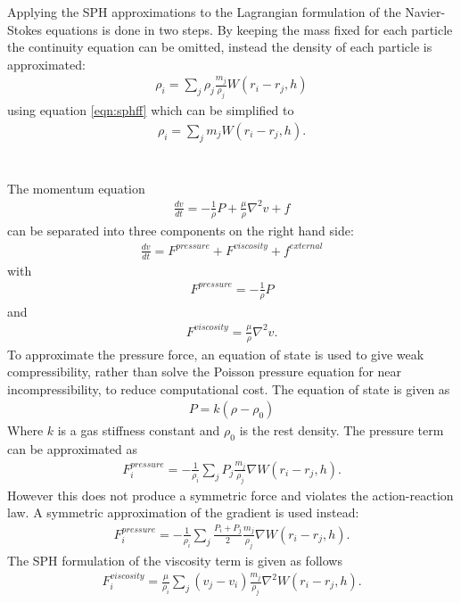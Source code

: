 Applying the SPH approximations to the Lagrangian formulation of the
Navier-Stokes equations is done in two steps. By keeping the mass fixed for each
particle the continuity equation can be omitted, instead the density of each particle is approximated:
\begin{align}
\rho_i = \sum_j \rho_j \frac{m_j}{\rho_j} W(r_i - r_j, h)
\end{align}
using equation \ref{eqn:sphff} which can be simplified to
\begin{align}
\rho_i = \sum_j m_j W(r_i - r_j, h).
\end{align}
\\
\\
The momentum equation
\begin{align}
\frac{dv}{dt} = -\frac{1}{\rho}P + \frac{\mu}{\rho} \nabla^2 v + f
\end{align}
can be separated into three components on the right hand side:
\begin{align} \frac{dv}{dt} = F^{pressure} + F^{viscosity} + f^{external} \end{align}
with
\begin{align}
F^{pressure} = -\frac{1}{\rho}P
\end{align}
and
\begin{align}
F^{viscosity} = \frac{\mu}{\rho} \nabla^2 v.
\end{align}
To approximate the pressure force, an equation of state is used to give weak
compressibility, rather than solve the Poisson pressure equation for near
incompressibility, to reduce computational cost.
The equation of state is given as 
\begin{align}
P = k(\rho - \rho_0)
\end{align}
Where $k$ is a gas stiffness constant and $\rho_0$ is the rest density.
The pressure term can be approximated as
\begin{align}
F^{pressure}_i = -\frac{1}{\rho_i} \sum_j P_j \frac{m_j}{\rho_j} \nabla W(r_i - r_j, h).
\end{align}
However this does not produce a symmetric force and violates the action-reaction law. A symmetric approximation of the gradient is used instead:
\begin{align}
F^{pressure}_i = -\frac{1}{\rho_i} \sum_j \frac{P_i + P_j}{2} \frac{m_j}{\rho_j} \nabla W(r_i - r_j, h).
\end{align}
The SPH formulation of the viscosity term is given as follows
\begin{align}
F^{viscosity}_i = \frac{\mu}{\rho_i} \sum_j (v_j - v_i) \frac{m_j}{\rho_j} \nabla^2 W(r_i - r_j, h).
\end{align}


